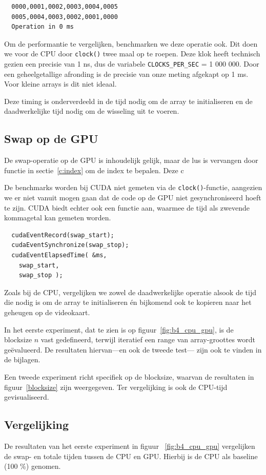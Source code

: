 \documentclass[twocolumn, a4paper]{article}
\begin{document}
\begin{verbatim}
  0000,0001,0002,0003,0004,0005
  0005,0004,0003,0002,0001,0000 
  Operation in 0 ms
\end{verbatim}

Om de performantie te vergelijken, benchmarken we deze operatie ook. Dit doen we voor de CPU door \texttt{clock()} twee maal op te roepen. Deze klok heeft technisch gezien een precisie van 1 ns, dus de variabele \texttt{CLOCKS_PER_SEC} = 1 000 000. Door een geheelgetallige afronding is de precisie van onze meting afgekapt op 1 ms. Voor kleine arrays is dit niet ideaal.

Deze timing is onderverdeeld in de tijd nodig om de array te initialiseren en de daadwerkelijke tijd nodig om de wisseling uit te voeren.

\subsection{Swap op de GPU}
De swap-operatie op de GPU is inhoudelijk gelijk, maar de lus is vervangen door functie in sectie~\ref{c:index} om de index te bepalen. Deze c

De benchmarks worden bij CUDA niet gemeten via de \texttt{clock()}-functie, aangezien we er niet vanuit mogen gaan dat de code op de GPU niet gesynchroniseerd hoeft te zijn. CUDA biedt echter ook een functie aan, waarmee de tijd als zwevende kommagetal kan gemeten worden. 

\begin{verbatim}
  cudaEventRecord(swap_start);
  cudaEventSynchronize(swap_stop);
  cudaEventElapsedTime( &ms, 
    swap_start, 
    swap_stop );
\end{verbatim}
 
Zoals bij de CPU, vergelijken we zowel de daadwerkelijke operatie alsook de tijd die nodig is om de array te initialiseren én bijkomend ook te kopieren naar het geheugen op de videokaart.

In het eerste experiment, dat te zien is op figuur~\ref{fig:b4_cpu_gpu}, is de blocksize $n$ vast gedefineerd, terwijl iteratief een range van array-groottes wordt ge\"evalueerd. De resultaten hiervan---en ook de tweede test--- zijn ook te vinden in de bijlagen.

Een tweede experiment richt specifiek op de blocksize, waarvan de resultaten in figuur~\ref{blocksize} zijn weergegeven. Ter vergelijking is ook de CPU-tijd gevisualiseerd. 

\subsection{Vergelijking}
De resultaten van het eerste experiment in figuur ~\ref{fig:b4_cpu_gpu} vergelijken de swap- en totale tijden tussen de CPU en GPU. Hierbij is de CPU als baseline (100 \%) genomen.
\end{document}
